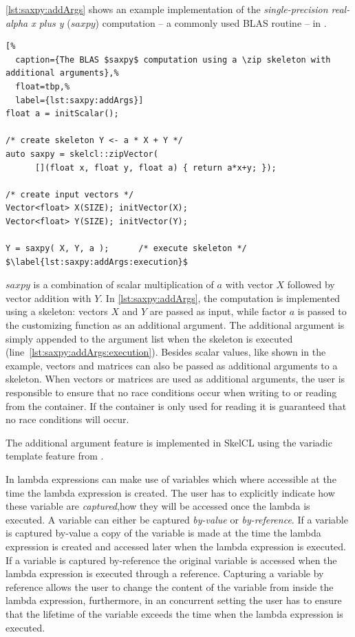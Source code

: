 \autoref{lst:saxpy:addArgs} shows an example implementation of the \emph{single-precision real-alpha x plus y} ($saxpy$) computation -- a commonly used BLAS routine -- in \SkelCL.
\begin{lstlisting}[%
  caption={The BLAS $saxpy$ computation using a \zip skeleton with additional arguments},%
  float=tbp,%
  label={lst:saxpy:addArgs}]
float a = initScalar();

/* create skeleton Y <- a * X + Y */
auto saxpy = skelcl::zipVector(
      [](float x, float y, float a) { return a*x+y; });

/* create input vectors */
Vector<float> X(SIZE); initVector(X);
Vector<float> Y(SIZE); initVector(Y);

Y = saxpy( X, Y, a );      /* execute skeleton */ $\label{lst:saxpy:addArgs:execution}$
\end{lstlisting}
$saxpy$ is a combination of scalar multiplication of $a$ with vector $X$ followed by vector addition with $Y$.
In \autoref{lst:saxpy:addArgs}, the computation is implemented using a \zip skeleton:
vectors $X$ and $Y$ are passed as input, while factor $a$ is passed to the customizing function as an additional argument.
The additional argument is simply appended to the argument list when the skeleton is executed (line~\ref{lst:saxpy:addArgs:execution}).
Besides scalar values, like shown in the example, vectors and matrices can also be passed as additional arguments to a skeleton.
When vectors or matrices are used as additional arguments, the user is responsible to ensure that no race conditions occur when writing to or reading from the container.
If the container is only used for reading it is guaranteed that no race conditions will occur.

The additional argument feature is implemented in SkelCL using the variadic template feature from \Cpp.

In \Cpp lambda expressions can make use of variables which where accessible at the time the lambda expression is created.
The user has to explicitly indicate how these variable are \emph{captured},\ie how they will be accessed once the lambda is executed.
A variable can either be captured \emph{by-value} or \emph{by-reference}.
If a variable is captured by-value a copy of the variable is made at the time the lambda expression is created and accessed later when the lambda expression is executed.
If a variable is captured by-reference the original variable is accessed when the lambda expression is executed through a reference.
Capturing a variable by reference allows the user to change the content of the variable from inside the lambda expression, furthermore, in an concurrent setting the user has to ensure that the lifetime of the variable exceeds the time when the lambda expression is executed.

